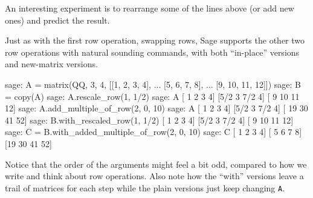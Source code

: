 %
An interesting experiment is to rearrange some of the lines above (or add new ones) and predict the result.\par
%
Just as with the first row operation, swapping rows, Sage supports the other two row operations with natural sounding commands, with both ``in-place'' versions and new-matrix versions.
%
\begin{sageexample}
sage: A = matrix(QQ, 3, 4, [[1,  2,  3,  4],
...                         [5,  6,  7,  8],
...                         [9, 10, 11, 12]])
sage: B = copy(A)
sage: A.rescale_row(1, 1/2)
sage: A
[  1   2   3   4]
[5/2   3 7/2   4]
[  9  10  11  12]
sage: A.add_multiple_of_row(2, 0, 10)
sage: A
[  1   2   3   4]
[5/2   3 7/2   4]
[ 19  30  41  52]
sage: B.with_rescaled_row(1, 1/2)
[  1   2   3   4]
[5/2   3 7/2   4]
[  9  10  11  12]
sage: C = B.with_added_multiple_of_row(2, 0, 10)
sage: C
[ 1  2  3  4]
[ 5  6  7  8]
[19 30 41 52]
\end{sageexample}
%
Notice that the order of the arguments might feel a bit odd, compared to how we write and think about row operations.  Also note how the ``with'' versions leave a trail of matrices for each step while the plain versions just keep changing \verb?A?.
%
\begin{sageverbatim}
\end{sageverbatim}
